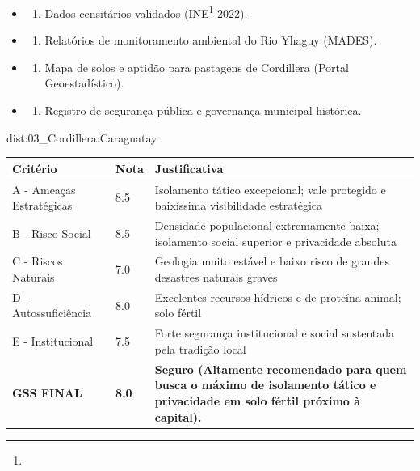 {\begin{itemize}
\tightlist
\item
  \begin{enumerate}
  \def\labelenumi{\arabic{enumi})}
  \tightlist
  \item
    Dados censitários validados (INE\footnote{\fineINE} 2022).
  \end{enumerate}
\item
  \begin{enumerate}
  \def\labelenumi{\arabic{enumi})}
  \setcounter{enumi}{1}
  \tightlist
  \item
    Relatórios de monitoramento ambiental do Rio Yhaguy (MADES).
  \end{enumerate}
\item
  \begin{enumerate}
  \def\labelenumi{\arabic{enumi})}
  \setcounter{enumi}{2}
  \tightlist
  \item
    Mapa de solos e aptidão para pastagens de Cordillera (Portal
    Geoestadístico).
  \end{enumerate}
\item
  \begin{enumerate}
  \def\labelenumi{\arabic{enumi})}
  \setcounter{enumi}{3}
  \tightlist
  \item
    Registro de segurança pública e governança municipal histórica.
  \end{enumerate}
\end{itemize}}{dist:03_Cordillera:Caraguatay}
\begin{table}[ht!]
\small \begin{tabular}{p{3.0cm}p{0.8cm}p{6.0cm}} \toprule
\textbf{Critério} & \textbf{Nota} & \textbf{Justificativa} \\ \midrule
A - Ameaças Estratégicas & 8.5 & Isolamento tático excepcional; vale protegido e baixíssima visibilidade estratégica \\
B - Risco Social & 8.5 & Densidade populacional extremamente baixa; isolamento social superior e privacidade absoluta \\
C - Riscos Naturais & 7.0 & Geologia muito estável e baixo risco de grandes desastres naturais graves \\
D - Autossuficiência & 8.0 & Excelentes recursos hídricos e de proteína animal; solo fértil \\
E - Institucional & 7.5 & Forte segurança institucional e social sustentada pela tradição local \\
\midrule \textbf{GSS FINAL} & \textbf{8.0} & \textbf{Seguro (Altamente recomendado para quem busca o máximo de isolamento tático e privacidade em solo fértil próximo à capital).} \\ \bottomrule \end{tabular}
\end{table}
